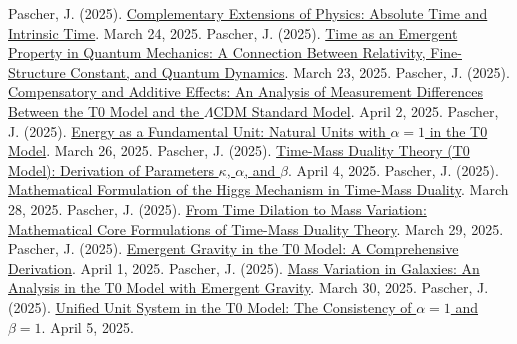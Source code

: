 \documentclass[12pt,a4paper]{article}
\begin{document}
	\begin{thebibliography}{99}
		 Pascher, J. (2025). \href{https://github.com/jpascher/T0-Time-Mass-Duality/tree/main/2/pdf/English/KomplementPhysikZeitEn.pdf}{Complementary Extensions of Physics: Absolute Time and Intrinsic Time}. March 24, 2025.
		 Pascher, J. (2025). \href{https://github.com/jpascher/T0-Time-Mass-Duality/tree/main/2/pdf/English/ZeitEmergentQMEn.pdf}{Time as an Emergent Property in Quantum Mechanics: A Connection Between Relativity, Fine-Structure Constant, and Quantum Dynamics}. March 23, 2025.
		 Pascher, J. (2025). \href{https://github.com/jpascher/T0-Time-Mass-Duality/tree/main/2/pdf/English/MessdifferenzenT0StandardEn.pdf}{Compensatory and Additive Effects: An Analysis of Measurement Differences Between the T0 Model and the \(\Lambda\)CDM Standard Model}. April 2, 2025.
		 Pascher, J. (2025). \href{https://github.com/jpascher/T0-Time-Mass-Duality/tree/main/2/pdf/English/NatEinheitenAlpha1En.pdf}{Energy as a Fundamental Unit: Natural Units with \(\alpha = 1\) in the T0 Model}. March 26, 2025.
		 Pascher, J. (2025). \href{https://github.com/jpascher/T0-Time-Mass-Duality/tree/main/2/pdf/English/ZeitMasseT0ParamsEn.pdf}{Time-Mass Duality Theory (T0 Model): Derivation of Parameters \(\kappa\), \(\alpha\), and \(\beta\)}. April 4, 2025.
		 Pascher, J. (2025). \href{https://github.com/jpascher/T0-Time-Mass-Duality/tree/main/2/pdf/English/MathHiggsZeitMasseEn.pdf}{Mathematical Formulation of the Higgs Mechanism in Time-Mass Duality}. March 28, 2025.
		 Pascher, J. (2025). \href{https://github.com/jpascher/T0-Time-Mass-Duality/tree/main/2/pdf/English/MathZeitMasseLagrangeEn.pdf}{From Time Dilation to Mass Variation: Mathematical Core Formulations of Time-Mass Duality Theory}. March 29, 2025.
		 Pascher, J. (2025). \href{https://github.com/jpascher/T0-Time-Mass-Duality/tree/main/2/pdf/English/EmergentGravT0En.pdf}{Emergent Gravity in the T0 Model: A Comprehensive Derivation}. April 1, 2025.
		 Pascher, J. (2025). \href{https://github.com/jpascher/T0-Time-Mass-Duality/tree/main/2/pdf/English/MassVarGalaxienEn.pdf}{Mass Variation in Galaxies: An Analysis in the T0 Model with Emergent Gravity}. March 30, 2025.
		 Pascher, J. (2025). \href{https://github.com/jpascher/T0-Time-Mass-Duality/tree/main/2/pdf/English/Alpha1Beta1KonsistenzEn.pdf}{Unified Unit System in the T0 Model: The Consistency of \(\alpha = 1\) and \(\beta = 1\)}. April 5, 2025.

\end{thebibliography}
\end{document}
